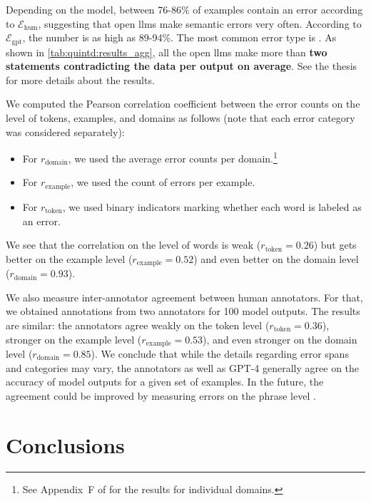 \documentclass[12pt,notitlepage,a4paper,oneside,openany]{report}
\newcommand*{\gptmetric}{$\mathcal{E}_{\text{gpt}}$}
\newcommand*{\humanmetric}{$\mathcal{E}_{\text{hum}}$}
\newcommand{\errinc}[1]{{\leavevmode\color{errred} \underLine{\textbf{#1\textsuperscript{I}}}}}
\renewcommand\cite{\citep}
\begin{document}
Depending on the model, between 76-86\% of examples contain an error according to \humanmetric, suggesting that open \acp{llm} make semantic errors very often. According to \gptmetric, the number is as high as 89-94\%. The most common error type is \errinc{INCORRECT}. As shown in \autoref{tab:quintd:results_agg}, all the open \acp{llm} make more than \textbf{two statements contradicting the data per output on average}. See the thesis for more details about the results.


We computed the Pearson correlation coefficient between the error counts on the level of tokens, examples, and domains as follows (note that each error category was considered separately):
\begin{itemize}
    \item For $r_{\text{domain}}$, we used the average error counts per domain.\footnote{See Appendix~F of \citet{kasnerReferenceBasedMetricsAnalyzing2024} for the results for individual domains.}
    \item For $r_{\text{example}}$, we used the count of errors per example.
    \item For $r_{\text{token}}$, we used binary indicators marking whether each word is labeled as an error.
\end{itemize}
We see that the correlation on the level of words is weak ($r_{\text{token}}=0.26$) but gets better on the example level ($r_{\text{example}}=0.52$) and even better on the domain level ($r_{\text{domain}}=0.93$).

We also measure inter-annotator agreement between human annotators. For that, we obtained annotations from two annotators for 100 model outputs. The results are similar: the annotators agree weakly on the token level ($r_{\text{token}}=0.36$), stronger on the example level ($r_{\text{example}}=0.53$), and even stronger on the domain level ($r_{\text{domain}}=0.85$). We conclude that while the details regarding error spans and categories may vary, the annotators as well as GPT-4 generally agree on the accuracy of model outputs for a given set of examples. In the future, the agreement could be improved by measuring errors on the phrase level \cite{vamvas2022little}.



\chapter{Conclusions}
\label{chap:conclusions}
\end{document}
